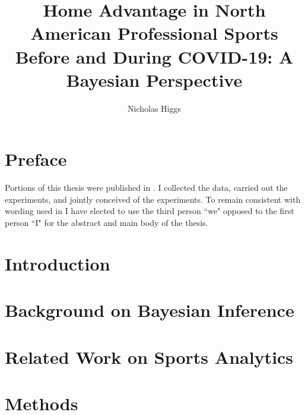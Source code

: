 \documentclass{uofsthesis-cs}
\title{Home Advantage in North American Professional Sports Before and During COVID-19: A Bayesian Perspective}
\author{Nicholas Higgs}
\begin{document}
\maketitle
{}

\frontmatter

\chapter*{Preface}
Portions of this thesis were published in \cite{Higgs2021}. I collected the data, carried out the experiments, and jointly conceived of the experiments. To remain consistent with wording used in \cite{Higgs2021} I have elected to use the third person ``we" opposed to the first person ``I" for the abstract and main body of the thesis.

\chapter{Introduction}



%
% 
% 
%


\chapter{Background on Bayesian Inference}


\chapter{Related Work on Sports Analytics}


\chapter{Methods}

\end{document}
